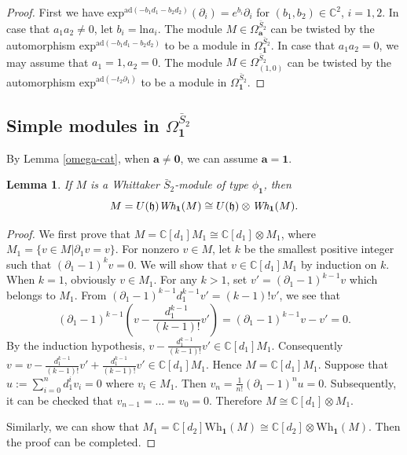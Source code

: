 \documentclass[12pt,a4paper]{amsart}
\newtheorem{Lemma}[Theorem]{Lemma}
\def\C{\mathbb{C}}
\def\ba{\mathbf{a}}
\def\p{\partial}
\begin{document}
\begin{proof} First we have $\mathrm{exp}^{\mathrm{ad}(-b_1d_1-b_2d_2)}(\p_i)=e^{b_i}\p_i$ for $(b_1,b_2)\in \C^2$, $i=1,2$. In case that $a_1a_2\neq 0$, let $b_i=\mathrm{ln}a_i$. The module $M\in \Omega^{\bar{S}_2}_\ba$ can be twisted by the automorphism $\mathrm{exp}^{\mathrm{ad}(-b_1d_1-b_2d_2)}$ to be a module in $\Omega^{\bar{S}_2}_{\mathbf{1}}$. In case that $a_1a_2=0$, we may assume that
$a_1=1,a_2=0$. The module $M\in \Omega^{\bar{S}_2}_{(1,0)}$ can be twisted by the automorphism $\mathrm{exp}^{\mathrm{ad}(-t_2\p_1)}$ to be a module in $\Omega^{\bar{S}_2}_{\mathbf{1}}$.
\end{proof}


\subsection{Simple modules in $\Omega^{\bar{S}_2}_{\mathbf{1}}$}

By Lemma \ref{omega-cat}, when $\ba\neq \mathbf{0}$, we can assume $\ba=\mathbf{1}$.


\begin{Lemma}\label{basis}
If  $M$ is a Whittaker $\bar{S}_2$-module of type $\phi_{\mathbf{1}}$, then
$$M=U(\mathfrak{h})\emph{Wh}_{\mathbf{1}}(M)\cong U(\mathfrak{h})\otimes\emph{Wh}_{\mathbf{1}}(M).$$
\end{Lemma}
\begin{proof}
We first prove that $M=\C[d_1]M_1\cong \C[d_1]\otimes M_1$,
where $M_1=\{v\in M| \p_1v=v\}$. For nonzero $v\in M$, let $k$ be the smallest
positive integer such that $(\p_1-1)^kv=0$. We will show that $v\in \C[d_1]M_1$
by induction on $k$. When $k=1$, obviously $v\in M_1$. For any  $k>1$,
set $v'=(\p_1-1)^{k-1}v$ which belongs to $M_1$.
From $(\p_1-1)^{k-1}d_1^{k-1}v'=(k-1)!v'$, we see that
$$(\p_1-1)^{k-1}(v-\frac{d_1^{k-1}}{(k-1)!}v')=(\p_1-1)^{k-1}v-v'=0.$$
By the induction hypothesis, $v-\frac{d_1^{k-1}}{(k-1)!}v'\in \C[d_1]M_1$.
Consequently $v=v-\frac{d_1^{k-1}}{(k-1)!}v'+\frac{d_1^{k-1}}{(k-1)!}v'\in \C[d_1]M_1$.
Hence $M=\C[d_1]M_1$. Suppose that $u:=\sum_{i=0}^n d_1^i v_i=0$ where $v_i\in M_1$. Then $v_n=\frac{1}{n!}(\p_1-1)^nu=0$. Subsequently, it can be checked that
$v_{n-1}=\dots=v_0=0$. Therefore  $M\cong \C[d_1]\otimes M_1$.

Similarly, we can show that $M_1=\C[d_2]\mathrm{Wh}_{\mathbf{1}}(M)\cong \C[d_2]\otimes\mathrm{Wh}_{\mathbf{1}}(M)$. Then the proof can be completed.
\end{proof}
\end{document}
